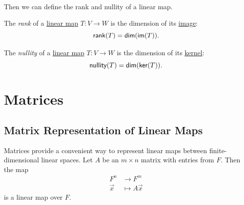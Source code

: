 Then we can define the rank and nullity of a linear map.
\begin{definition}[Rank]\label{def:rank}
  The \emph{rank} of a \hyperref[def:linear_map]{linear map} $T \colon V \to W$ is the dimension of its \hyperref[def:image]{image}:
  \[
    \operatorname{\text{\normalfont\sffamily rank}}(T) = \operatorname{\text{\normalfont\sffamily dim}}(\operatorname{\text{\normalfont\sffamily im}}(T)).
  \]
\end{definition}

\begin{definition}[Nullity]\label{def:nullity}
  The \emph{nullity} of a \hyperref[def:linear_map]{linear map} $T \colon V \to W$ is the dimension of its \hyperref[def:kernel]{kernel}:
  \[
    \operatorname{\text{\normalfont\sffamily nullity}}(T) = \operatorname{\text{\normalfont\sffamily dim}}(\operatorname{\text{\normalfont\sffamily ker}}(T)).
  \]
\end{definition}

\section{Matrices}

\subsection{Matrix Representation of Linear Maps}
Matrices provide a convenient way to represent linear maps between finite-dimensional linear spaces. Let $A$ be an $m \times n$ matrix with entries from $F$. Then the map
\begin{align*}
  F^n     & \to F^m           \\
  \vec{x} & \mapsto A \vec{x}
\end{align*}
is a linear map over $F$.

